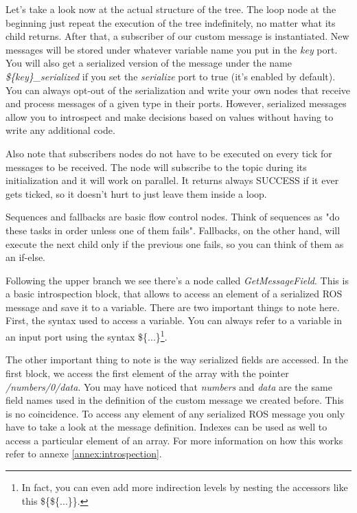\documentclass[a4paper,12pt]{article}
\begin{document}
Let's take a look now at the actual structure of the tree. The loop node at the beginning just repeat the execution of the tree indefinitely, no matter what its child returns. After that, a subscriber of our custom message is instantiated. New messages will be stored under whatever variable name you put in the \textit{key} port. You will also get a serialized version of the message under the name \textit{\$\{key\}_serialized} if you set the \textit{serialize} port to true (it's enabled by default). You can always opt-out of the serialization and write your own nodes that receive and process messages of a given type in their ports. However, serialized messages allow you to introspect and make decisions based on values without having to write any additional code.

Also note that subscribers nodes do not have to be executed on every tick for messages to be received. The node will subscribe to the topic during its initialization and it will work on parallel. It returns always SUCCESS if it ever gets ticked, so it doesn't hurt to just leave them inside a loop.

Sequences and fallbacks are basic flow control nodes. Think of sequences as "do these tasks in order unless one of them fails". Fallbacks, on the other hand, will execute the next child only if the previous one fails, so you can think of them as an if-else.

Following the upper branch we see there's a node called \textit{GetMessageField}. This is a basic introspection block, that allows to access an element of a serialized ROS message and save it to a variable. There are two important things to note here. First, the syntax used to access a variable. You can always refer to a variable in an input port using the syntax \$\{...\}\footnote{In fact, you can even add more indirection levels by nesting the accessors like this \$\{\$\{...\}\}.}.

The other important thing to note is the way serialized fields are accessed. In the first block, we access the first element of the array with the pointer \textit{/numbers/0/data}. You may have noticed that \textit{numbers} and \textit{data} are the same field names used in the definition of the custom message we created before. This is no coincidence. To access any element of any serialized ROS message you only have to take a look at the message definition. Indexes can be used as well to access a particular element of an array. For more information on how this works refer to annexe \ref{annex:introspection}.
\end{document}
